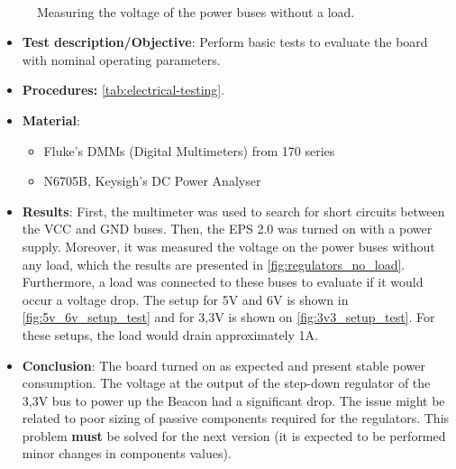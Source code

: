 \begin{figure}[!htb]
    \begin{center}
        \hspace{10pt}%
         \\
        
        \hspace{10pt}%

        \caption{Measuring the voltage of the power buses without a load.}
        \label{fig:regulators_no_load}
    \end{center}
\end{figure}

\begin{itemize}
    \item \textbf{Test description/Objective}: Perform basic tests to evaluate the board with nominal operating parameters.
    \item \textbf{Procedures:} \autoref{tab:electrical-testing}.
    \item \textbf{Material}:
        \begin{itemize}
            \item Fluke's DMMs (Digital Multimeters) from 170 series
            \item N6705B, Keysigh's DC Power Analyser
        \end{itemize}
    \item \textbf{Results}: First, the multimeter was used to search for short circuits between the VCC and GND buses. Then, the EPS 2.0 was turned on with a power supply. Moreover, it was measured the voltage on the power buses without any load, which the results are presented in \autoref{fig:regulators_no_load}. Furthermore, a load was connected to these buses to evaluate if it would occur a voltage drop. The setup for 5V and 6V is shown in \autoref{fig:5v_6v_setup_test} and for 3,3V is shown on \autoref{fig:3v3_setup_test}. For these setups, the load would drain approximately 1A.
    \item \textbf{Conclusion}: The board turned on as expected and present stable power consumption. The voltage at the output of the step-down regulator of the 3,3V bus to power up the Beacon had a significant drop. The issue might be related to poor sizing of passive components required for the regulators. This problem \textbf{must} be solved for the next version (it is expected to be performed minor changes in components values).  
\end{itemize}

